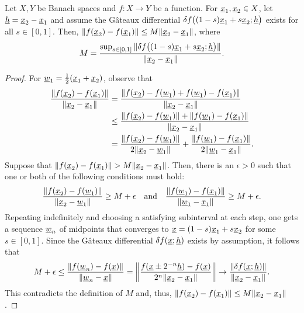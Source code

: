 \begin{theorem} \label{theorem:mean_value_inequality}
Let $X,Y$ be Banach spaces and $f \colon X \rightarrow Y$ be a function.
For $\underline{x}_1,\underline{x}_2 \in X$, let $\underline{h} = \underline{x}_2 - \underline{x}_1$ and assume the G\^{a}teaux differential $\delta f \big( (1-s)\underline{x}_1+s\underline{x}_2; \underline{h}\big)$ exists for all $s\in [0,1]$.
Then, $\|f(\underline{x}_2)-f(\underline{x}_1)\| \leq M \| \underline{x}_2 - \underline{x}_1 \|$, where
\[ M = \frac{\sup_{s \in [0,1]} \| \delta f \big( (1-s)\underline{x}_1+s\underline{x}_2; \underline{h}\big)\|}{\| \underline{x}_2 - \underline{x}_1 \|}. \]
\end{theorem}
\begin{proof}
For $\underline{w}_1 = \frac{1}{2}(\underline{x}_1+\underline{x}_2)$, observe that
\begin{align*}
\frac{\|f(\underline{x}_2)-f(\underline{x}_1)\|}{\| \underline{x}_2 - \underline{x}_1 \|} &=  \frac{\|f(\underline{x_2})-f(\underline{w}_1) + f(\underline{w}_1)-f(\underline{x}_1)\|}{\| \underline{x}_2 - \underline{x}_1 \|} \\
&\leq 
 \frac{\|f(\underline{x}_2)-f(\underline{w}_1)\| + \|f(\underline{w}_1)-f(\underline{x}_1)\|}{\| \underline{x}_2 - \underline{x}_1 \|} \\
&=  \frac{\|f(\underline{x}_2)-f(\underline{w}_1)\|}{2 \| \underline{x}_2 - \underline{w}_1 \|} +  \frac{\|f(\underline{w}_1)-f(\underline{x}_1)\|}{2 \| \underline{w}_1 - \underline{x}_1 \|}.
\end{align*}
Suppose that $\|f(\underline{x}_2)-f(\underline{x}_1)\| > M \| \underline{x}_2 - \underline{x}_1\|$.
Then, there is an $\epsilon > 0$ such that one or both of the following conditions must hold:
\[ \frac{\|f(\underline{x}_2)-f(\underline{w}_1)\|}{\| \underline{x}_2 - \underline{w}_1 \|} \geq M + \epsilon  \quad \text{and} \quad \frac{\|f(\underline{w}_1)-f(\underline{x}_1)\|}{\| \underline{w}_1 - \underline{x}_1 \|} \geq M + \epsilon. \]
Repeating indefinitely and choosing a satisfying subinterval at each step, one gets a sequence $\underline{w}_n$ of midpoints that converges to $\underline{x}=  (1-s)\underline{x}_1+s\underline{x}_2 $ for some $s\in [0,1]$.
Since the G\^{a}teaux differential $\delta f (\underline{x};\underline{h})$ exists by assumption, it follows that
\[ M + \epsilon \leq \frac{\|f(\underline{w}_n)-f(\underline{x})\|}{\| \underline{w}_n - \underline{x} \|} = \left\| \frac{f(\underline{x}\pm 2^{-n} \underline{h})-f(\underline{x})}{2^n \| \underline{x}_2 - \underline{x}_1 \|} \right\| \to \frac{\| \delta f (\underline{x};\underline{h}) \|}{\| \underline{x}_2 - \underline{x}_1 \|}. \] 
This contradicts the definition of $M$ and, thus, $\|f(\underline{x}_2)-f(\underline{x}_1)\| \leq M \| \underline{x}_2 - \underline{x}_1\|$.
\end{proof}

